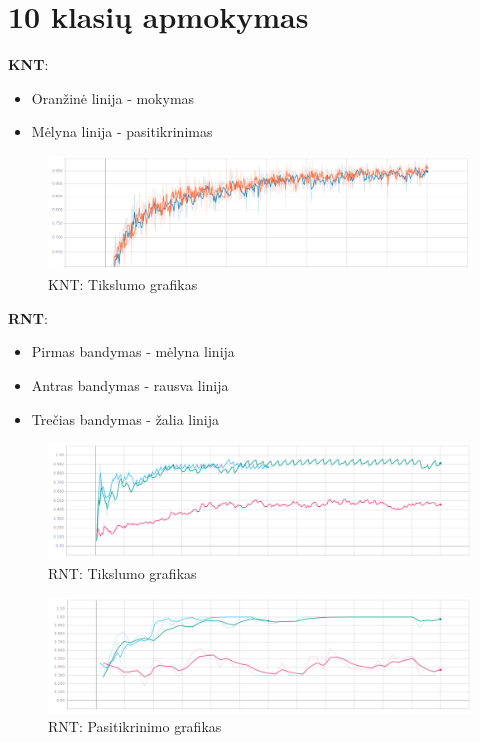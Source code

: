 \documentclass{VUMIFPSbakalaurinis}
\begin{document}
\section{10 klasių apmokymas}
\label{appendix:10kl}

\textbf{KNT}:
\begin{itemize}
	\item Oranžinė linija - mokymas
	\item Mėlyna linija - pasitikrinimas
\end{itemize}

\begin{figure}[H]
	\centering
	\includegraphics[scale=0.3]{img/2/knn-acc}
	\caption{KNT: Tikslumo grafikas}
	\label{img:10KNT-acc}
\end{figure}


\textbf{RNT}:
\begin{itemize}
	\item Pirmas bandymas - mėlyna linija
	\item Antras bandymas - rausva linija
	\item Trečias bandymas - žalia linija
\end{itemize}

\begin{figure}[H]
	\centering
	\includegraphics[scale=0.3]{img/2/acc}
	\caption{RNT: Tikslumo grafikas}
	\label{img:10acc}
\end{figure}

\begin{figure}[H]
	\centering
	\includegraphics[scale=0.3]{img/2/val}
	\caption{RNT: Pasitikrinimo grafikas}
	\label{img:10val}
\end{figure}
\end{document}

